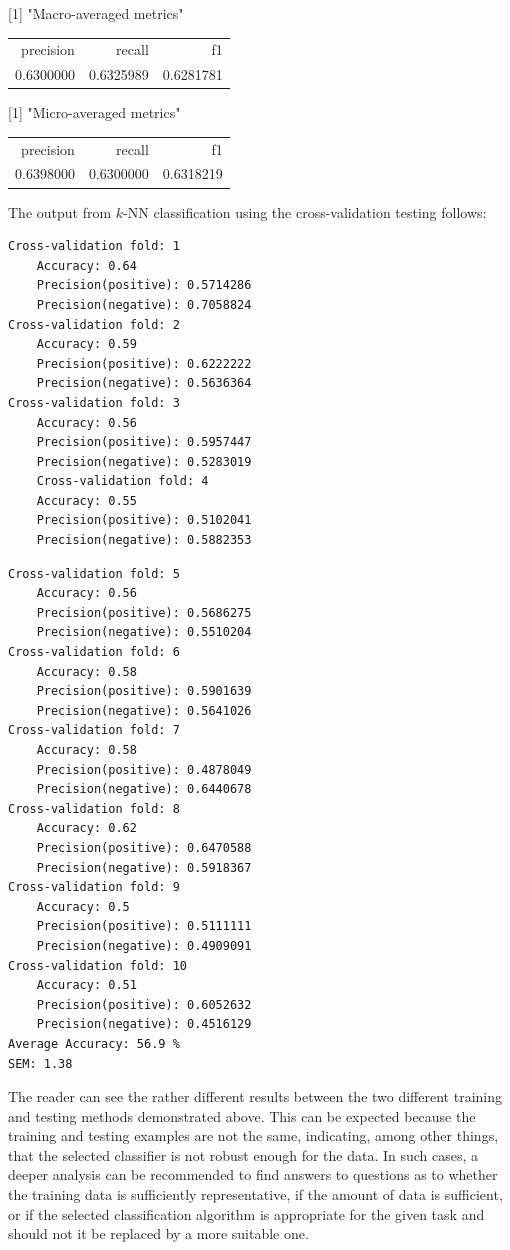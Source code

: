 \hspace{-0.3cm}[1] "Macro-averaged metrics"

\begin{flushleft}
\begin{tabular}{rrr}
precision & recall & f1 \\
0.6300000 & 0.6325989 & 0.6281781 \\
\end{tabular}
\end{flushleft}

\hspace{-0.3cm}[1] "Micro-averaged metrics"

\begin{flushleft}
\begin{tabular}{rrr}
precision & recall & f1 \\
0.6398000 & 0.6300000 & 0.6318219 \\
\end{tabular}
\end{flushleft}

The output from $k$-NN classification using the cross-validation testing follows:

\begin{verbatim}
Cross-validation fold: 1
    Accuracy: 0.64
    Precision(positive): 0.5714286
    Precision(negative): 0.7058824
Cross-validation fold: 2
    Accuracy: 0.59
    Precision(positive): 0.6222222
    Precision(negative): 0.5636364
Cross-validation fold: 3
    Accuracy: 0.56
    Precision(positive): 0.5957447
    Precision(negative): 0.5283019
    Cross-validation fold: 4
    Accuracy: 0.55
    Precision(positive): 0.5102041
    Precision(negative): 0.5882353
\end{verbatim}

\begin{verbatim}
Cross-validation fold: 5
    Accuracy: 0.56
    Precision(positive): 0.5686275
    Precision(negative): 0.5510204
Cross-validation fold: 6
    Accuracy: 0.58
    Precision(positive): 0.5901639
    Precision(negative): 0.5641026
Cross-validation fold: 7
    Accuracy: 0.58
    Precision(positive): 0.4878049
    Precision(negative): 0.6440678
Cross-validation fold: 8
    Accuracy: 0.62
    Precision(positive): 0.6470588
    Precision(negative): 0.5918367
Cross-validation fold: 9
    Accuracy: 0.5
    Precision(positive): 0.5111111
    Precision(negative): 0.4909091
Cross-validation fold: 10
    Accuracy: 0.51
    Precision(positive): 0.6052632
    Precision(negative): 0.4516129
Average Accuracy: 56.9 %
SEM: 1.38
\end{verbatim}

The reader can see the rather different results between the two different training and testing methods demonstrated above. This can be expected because the training and testing examples are not the same, indicating, among other things, that the selected classifier is not robust enough for the data. In such cases, a deeper analysis can be recommended to find answers to questions as to whether the training data is sufficiently representative, if the amount of data is sufficient, or if the selected classification algorithm is appropriate for the given task and should not it be replaced by a more suitable one.